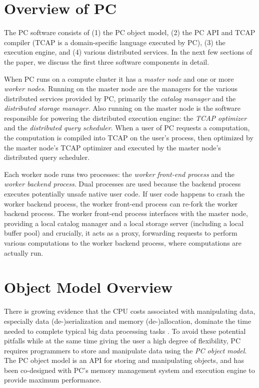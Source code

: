 
\section{Overview of PC}

The PC software consists of 
(1) the PC object model, (2) the PC API and TCAP compiler (TCAP is a domain-specific language executed by PC),
(3) the execution engine, and (4) various distributed services.  In the next few sections of the paper, 
we discuss the first three software components in detail.

When PC runs on a compute cluster it has a \emph{master node} and one or more \emph{worker nodes}.
Running on the master node are the managers for the various distributed services provided by PC, primarily 
the \emph{catalog manager} and the \emph{distributed storage manager}.  Also running on the master
node is the software responsible for powering the distributed execution engine: the \emph{TCAP optimizer} and
the \emph{distributed query scheduler}.  
When a user of PC requests a computation, the computation is compiled into TCAP on the user's process, then optimized
by the master node's TCAP optimizer and executed by the master node's distributed query scheduler.

Each worker node runs two processes: the \emph{worker front-end process} and the \emph{worker backend process}.
Dual processes are used because the backend process
executes potentially unsafe native user code.
If
user code happens to crash the worker backend process, the worker 
front-end process can re-fork the worker
backend process.  
The worker front-end process interfaces with the master node, providing a local catalog manager and a local storage server (including
a local buffer pool)
and crucially, it acts as a proxy, forwarding requests to perform various computations to the worker backend process, where
computations are actually run.

\section{Object Model Overview}

There is growing evidence that the CPU costs associated with manipulating data, especially data (de-)serialization and memory 
(de-)allocation,  
dominate the time needed to complete typical big data processing tasks
\cite{ousterhout2015making, shi2015clash}.
To avoid these potential pitfalls while at the same time giving the user a high degree of flexibility,
PC requires programmers to store and manipulate data using the \emph{PC object model}.
The PC object model is an API for storing and manipulating objects, and has been co-designed with PC's memory management system and execution engine to provide
maximum performance.  

